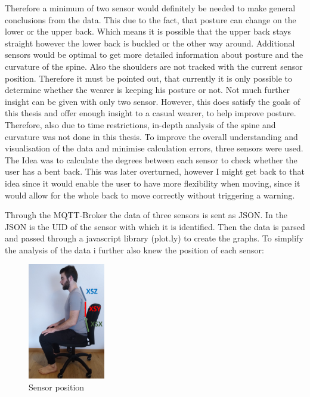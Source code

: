 Therefore a minimum of two sensor would definitely be needed to make general conclusions from the data. This due to the fact, that posture can change on the lower or the upper back. Which means it is possible that the upper back stays straight however the lower back is buckled or the other way around. Additional sensors would be optimal to get more detailed information about posture and the curvature of the spine. Also the shoulders are not tracked with the current sensor position. Therefore it must be pointed out, that currently it is only possible to determine whether the wearer is keeping his posture or not. Not much further insight can be given with only two sensor. However, this does satisfy the goals of this thesis and offer enough insight to a casual wearer, to help improve posture. Therefore, also due to time restrictions, in-depth analysis of the spine and curvature was not done in this thesis. To improve the overall understanding and visualisation of the data and minimise calculation errors, three sensors were used. The Idea was to calculate the degrees between each sensor to check whether the user has a bent back. This was later overturned, however I might get back to that idea since it would enable the user to have more flexibility when moving, since it would allow for the whole back to move correctly without triggering a warning.

Through the MQTT-Broker the data of three sensors is sent as JSON. In the JSON is the UID of the sensor with which it is identified. Then the data is parsed and passed through a javascript library (plot.ly) \cite{ModernAn18:online} to create the graphs. To simplify the analysis of the data i further also knew the position of each sensor:

\begin{figure}[ht]
  \begin{center}
\includegraphics[width=0.3\textwidth]{images/ChairVisualised.png}
  \end{center}
  \caption{Sensor position}
  \label{fig:SensorPos}
\end{figure}

